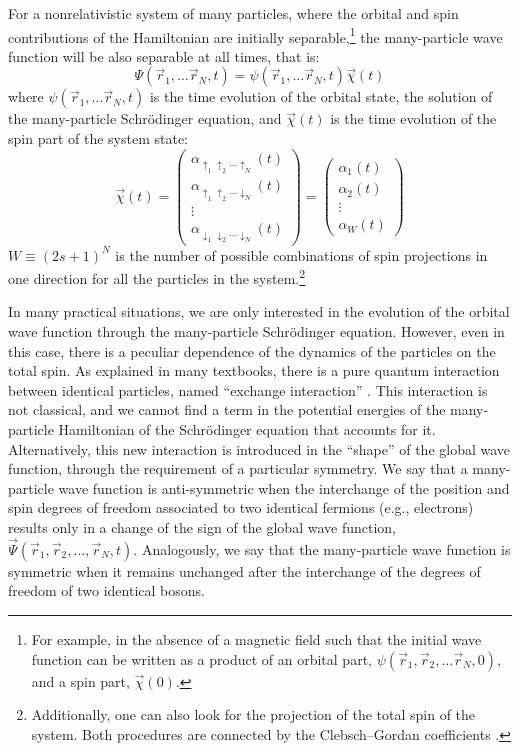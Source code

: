 \documentclass[nofootinbib, secnumarabic, amsmath, nobibnotes,10pt,aps,pra]{revtex4-1}
\begin{document}
For a nonrelativistic system of many particles, where the orbital
and spin contributions of the Hamiltonian are initially separable,\footnote{For
example, in the absence of a magnetic field such that  the initial wave
function can be written as a product of an orbital part, $\psi(\vec
r_1,\vec r_2,\ldots\vec r_N,0)$, and a spin part, $\vec \chi(0)$.}
the many-particle wave function will be also separable at all times,
that is:
\begin{equation}
\label{om.spinND}
\Psi(\vec r_1,\ldots\vec r_N,t) = \psi(\vec r_1,\ldots\vec r_N,t) \vec \chi(t)
\end{equation}
where $\psi(\vec r_1,\ldots\vec r_N,t)$ is the time evolution of the orbital state, the solution of the many-particle Schr\"odinger equation, and $\vec \chi(t)$ is the time evolution of the spin part of the system state:
\begin{equation}
\vec \chi(t) = \left(
\begin{array}{c}
\alpha_{\uparrow_1 \uparrow_2\ldots\uparrow_N}(t) \\ \alpha_{\uparrow_1 \uparrow_2\ldots\downarrow_N}(t) \\ \vdots \\ \alpha_{\downarrow_1 \downarrow_2\ldots\downarrow_N}(t)
\end{array}
\right) = \left(
\begin{array}{c}
\alpha_{1}(t) \\ \alpha_{2}(t) \\ \vdots \\ \alpha_{W}(t)
\end{array}
\right)
\end{equation}
$W \equiv (2s + 1)^N$ is the number of possible combinations of spin
projections in one direction for all the particles in the
system.\footnote{Additionally, one can also
look for the projection of the total spin of the system. Both
procedures are connected by the Clebsch--Gordan coefficients
\cite{om.landaulif}.}

In many practical situations, we are only interested in the
evolution of the orbital wave function through the many-particle
Schr\"odinger equation. However, even in this case, there is a
peculiar dependence of the dynamics of the particles on the total
spin. As explained in many textbooks, there is a pure quantum
interaction between identical particles, named ``exchange
interaction'' \cite{om.sakurai94,om.landaulif}. This interaction is
not classical, and we cannot find a term in the potential energies
of the many-particle Hamiltonian of the Schr\"odinger equation that
accounts for it. Alternatively, this new interaction is introduced
in the ``shape'' of the global wave function, through the
requirement of a particular symmetry. We
say that a many-particle wave function is anti-symmetric when the interchange of
the position and spin degrees of freedom associated to two
identical fermions (e.g., electrons) results only in a change of the
sign of the global wave function, $\vec \Psi(\vec r_1,\vec
r_2,\ldots,\vec r_N,t)$. Analogously, we say that the
many-particle wave function is symmetric when it
remains unchanged after the interchange of the degrees of freedom of
two identical  bosons.
\end{document}
